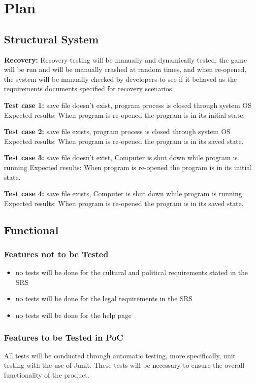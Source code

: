 \documentclass[12pt]{article}
\begin{document}
	
	\section{Plan}
	\subsection{Structural System}
    \textbf{Recovery: } Recovery testing will be manually and dynamically tested; the game will be run and will be manually crashed at random times, and when re-opened, the system will be manually checked by developers to see if it behaved as the requirements documents specified for recovery scenarios. 

	\textbf{Test case 1: }save file doesn’t exist, program process is closed through system OS
Expected results: When program is re-opened the program is in its initial state.

	\textbf{Test case 2: }save file exists, program process is closed through system OS
Expected results: When program is re-opened the program is in its saved state.

	\textbf{Test case 3: }save file doesn’t exist, Computer is shut down while program is running
Expected results: When program is re-opened the program is in its initial state.

	\textbf{Test case 4: } save file exists, Computer is shut down while program is running
Expected results: When program is re-opened the program is in its saved state.

	\subsection{Functional}
	\subsubsection{Features not to be Tested}
	\begin{itemize}
	\item no tests will be done for the cultural and political requirements stated in the SRS
	\item no tests will be done for the legal requirements in the SRS
	\item no tests will be done for the help page	
	\end{itemize}
	
	\subsubsection{Features to be Tested in PoC}
	All tests will be conducted through automatic testing, more specifically, unit testing with the use of Junit. These tests will be necessary to ensure the overall functionality of the product.\\
\end{document}
